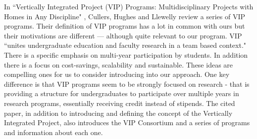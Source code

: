 In ``Vertically Integrated Project (VIP) Programs: Multidisciplinary Projects with Homes in Any Discipline" \cite{VIP}, Cullers, Hughes and Llewelly review a series of VIP programs. Their definition of VIP programs has a lot in common with ours but their motivations are different --- although quite relevant to our program. VIP ``unites undergraduate education and faculty research in a team based context." There is a specific emphasis on multi-year participation by students. In addition there is a focus on cost-savings, scalability and sustainable. These ideas are compelling ones for us to consider introducing into our approach. One key difference is that VIP programs seem to be strongly focused on research - that is providing a structure for undergraduates to participate over multiple years in research programs, essentially receiving credit instead of stipends. The cited paper, in addition to introducing and defining the concept of the Vertically Integrated Project, also introduces the VIP Consortium and a series of programs and information about each one.

